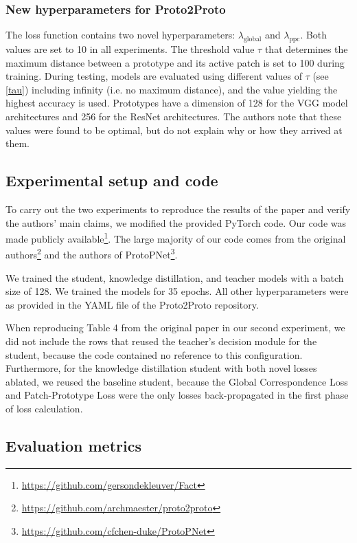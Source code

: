 \subsubsection{New hyperparameters for Proto2Proto}
The loss function contains two novel hyperparameters: $\lambda_{\text{global}}$ and $\lambda_{\text{ppc}}$. Both values are set to 10 in all experiments. The threshold value $\tau$ that determines the maximum distance between a prototype and its active patch is set to 100 during training. During testing, models are evaluated using different values of $\tau$ (see \ref{tau}) including infinity (i.e. no maximum distance), and the value yielding the highest accuracy is used. Prototypes have a dimension of 128 for the VGG model architectures and 256 for the ResNet architectures. The authors note that these values were found to be optimal, but do not explain why or how they arrived at them.


\subsection{Experimental setup and code}
To carry out the two experiments to reproduce the results of the paper and verify the authors' main claims, we modified the provided PyTorch code. Our code was made publicly available\footnote{\url{https://github.com/gersondekleuver/Fact}}. The large majority of our code comes from the original authors\footnote{\url{https://github.com/archmaester/proto2proto}} and the authors of ProtoPNet\footnote{\url{https://github.com/cfchen-duke/ProtoPNet}}.\par 
We trained the student, knowledge distillation, and teacher models with a batch size of 128. We trained the models for 35 epochs. All other hyperparameters were as provided in the YAML file of the Proto2Proto repository.\par
When reproducing Table 4 from the original paper in our second experiment, we did not include the rows that reused the teacher's decision module for the student, because the code contained no reference to this configuration. Furthermore, for the knowledge distillation student with both novel losses ablated, we reused the baseline student, because the Global Correspondence Loss and Patch-Prototype Loss were the only losses back-propagated in the first phase of loss calculation.


\subsection{Evaluation metrics}

